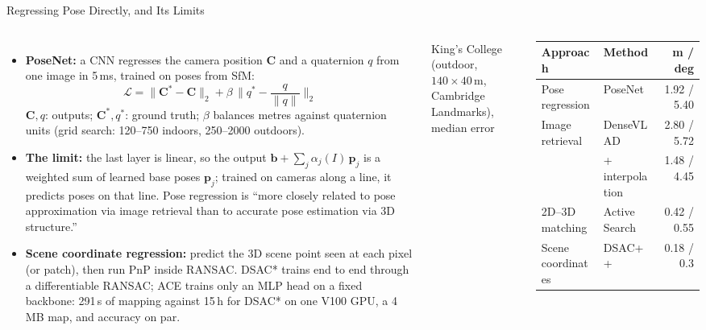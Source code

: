 \begin{frame}{Regressing Pose Directly, and Its Limits}
  \begin{columns}[T,onlytextwidth]
      \begin{itemize}\footnotesize\itemsep0.25em
        \item \textbf{PoseNet:} a CNN regresses the camera position $\mathbf{C}$ and a quaternion $q$ from one image in 5\,ms, trained on poses from SfM:
        \[ \mathcal{L}=\lVert\mathbf{C}^{*}-\mathbf{C}\rVert_2+\beta\,\Big\lVert q^{*}-\frac{q}{\lVert q\rVert}\Big\rVert_2 \]
        $\mathbf{C},q$: outputs; $\mathbf{C}^{*},q^{*}$: ground truth; $\beta$ balances metres against quaternion units (grid search: 120--750 indoors, 250--2000 outdoors).
        \item \textbf{The limit:} the last layer is linear, so the output $\mathbf{b}+\sum_j\alpha_j(I)\,\mathbf{p}_j$ is a weighted sum of learned base poses $\mathbf{p}_j$; trained on cameras along a line, it predicts poses on that line. Pose regression is ``more closely related to pose approximation via image retrieval than to accurate pose estimation via 3D structure.''
        \item \textbf{Scene coordinate regression:} predict the 3D scene point seen at each pixel (or patch), then run PnP inside RANSAC. DSAC* trains end to end through a differentiable RANSAC; ACE trains only an MLP head on a fixed backbone: 291\,s of mapping against 15\,h for DSAC* on one V100 GPU, a 4\,MB map, and accuracy on par.
      \end{itemize}
      \centering
      {\scriptsize King's College (outdoor, $140\times40$\,m, Cambridge Landmarks), median error\par}
      \vspace{0.2em}
      {\scriptsize\setlength{\tabcolsep}{3pt}
      \begin{tabular}{l l r}
        \toprule
        \textbf{Approach} & \textbf{Method} & \textbf{m / deg} \\
        \midrule
        Pose regression & PoseNet & 1.92 / 5.40 \\
        Image retrieval & DenseVLAD & 2.80 / 5.72 \\
                        & + interpolation & 1.48 / 4.45 \\
        2D--3D matching & Active Search & 0.42 / 0.55 \\
        Scene coordinates & DSAC++ & 0.18 / 0.3 \\

\end{tabular}}
\end{columns}
\end{frame}
